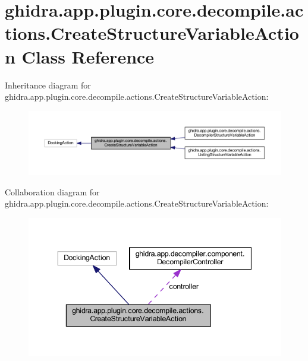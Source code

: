 \hypertarget{classghidra_1_1app_1_1plugin_1_1core_1_1decompile_1_1actions_1_1_create_structure_variable_action}{}\section{ghidra.\+app.\+plugin.\+core.\+decompile.\+actions.\+Create\+Structure\+Variable\+Action Class Reference}
\label{classghidra_1_1app_1_1plugin_1_1core_1_1decompile_1_1actions_1_1_create_structure_variable_action}


Inheritance diagram for ghidra.\+app.\+plugin.\+core.\+decompile.\+actions.\+Create\+Structure\+Variable\+Action\+:
\nopagebreak
\begin{figure}[H]
\begin{center}
\leavevmode
\includegraphics[width=350pt]{classghidra_1_1app_1_1plugin_1_1core_1_1decompile_1_1actions_1_1_create_structure_variable_action__inherit__graph}
\end{center}
\end{figure}


Collaboration diagram for ghidra.\+app.\+plugin.\+core.\+decompile.\+actions.\+Create\+Structure\+Variable\+Action\+:
\nopagebreak
\begin{figure}[H]
\begin{center}
\leavevmode
\includegraphics[width=344pt]{classghidra_1_1app_1_1plugin_1_1core_1_1decompile_1_1actions_1_1_create_structure_variable_action__coll__graph}
\end{center}
\end{figure}
